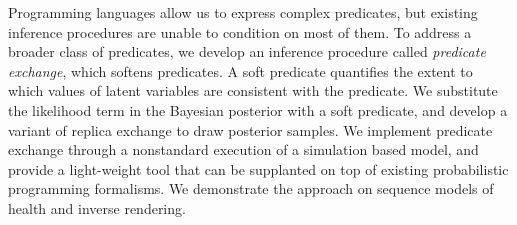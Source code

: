 Programming languages allow us to express complex predicates, but existing inference procedures are unable to condition on most of them.
To address a broader class of predicates, we develop an inference procedure called \emph{predicate exchange}, which softens predicates.
A soft predicate quantifies the extent to which values of latent variables
are consistent with the predicate.
We substitute the likelihood term in the Bayesian posterior with a soft predicate, and develop a variant of replica exchange to draw posterior samples.
We implement predicate exchange through a nonstandard execution of a simulation based model, and provide a light-weight tool that can be supplanted on top of existing probabilistic programming formalisms. 
We demonstrate the approach on sequence models of health and inverse rendering. 



%       